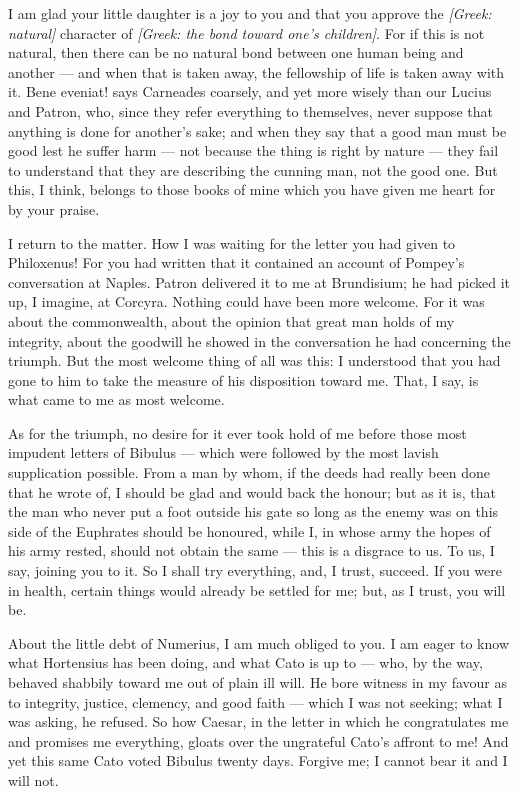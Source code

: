  I am glad your little daughter is a joy to you and that you approve the \textit{[Greek: natural]} character of \textit{[Greek: the bond toward one's children]}. For if this is not natural, then there can be no natural bond between one human being and another --- and when that is taken away, the fellowship of life is taken away with it. Bene eveniat! says Carneades coarsely, and yet more wisely than our Lucius and Patron, who, since they refer everything to themselves, never suppose that anything is done for another's sake; and when they say that a good man must be good lest he suffer harm --- not because the thing is right by nature --- they fail to understand that they are describing the cunning man, not the good one. But this, I think, belongs to those books of mine which you have given me heart for by your praise.

 I return to the matter. How I was waiting for the letter you had given to Philoxenus! For you had written that it contained an account of Pompey's conversation at Naples. Patron delivered it to me at Brundisium; he had picked it up, I imagine, at Corcyra. Nothing could have been more welcome. For it was about the commonwealth, about the opinion that great man holds of my integrity, about the goodwill he showed in the conversation he had concerning the triumph. But the most welcome thing of all was this: I understood that you had gone to him to take the measure of his disposition toward me. That, I say, is what came to me as most welcome.

 As for the triumph, no desire for it ever took hold of me before those most impudent letters of Bibulus --- which were followed by the most lavish supplication possible. From a man by whom, if the deeds had really been done that he wrote of, I should be glad and would back the honour; but as it is, that the man who never put a foot outside his gate so long as the enemy was on this side of the Euphrates should be honoured, while I, in whose army the hopes of his army rested, should not obtain the same --- this is a disgrace to us. To us, I say, joining you to it. So I shall try everything, and, I trust, succeed. If you were in health, certain things would already be settled for me; but, as I trust, you will be.

 About the little debt of Numerius, I am much obliged to you. I am eager to know what Hortensius has been doing, and what Cato is up to --- who, by the way, behaved shabbily toward me out of plain ill will. He bore witness in my favour as to integrity, justice, clemency, and good faith --- which I was not seeking; what I was asking, he refused. So how Caesar, in the letter in which he congratulates me and promises me everything, gloats over the ungrateful Cato's affront to me! And yet this same Cato voted Bibulus twenty days. Forgive me; I cannot bear it and I will not.

